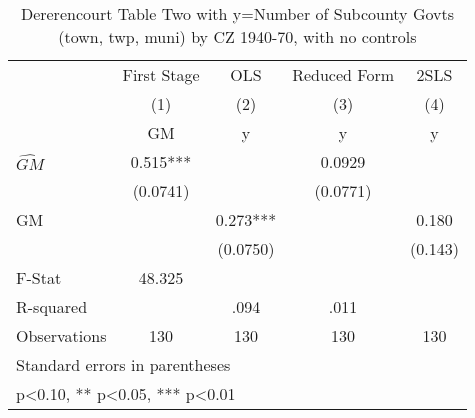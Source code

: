 \begin{table}[htbp]\centering
\def\sym#1{\ifmmode^{#1}\else\(^{#1}\)\fi}
\caption{Dererencourt Table Two with y=Number of Subcounty Govts (town, twp, muni) by CZ 1940-70, with no controls}
\begin{tabular}{l*{4}{c}}
\toprule
                    & First Stage   &         OLS   &Reduced Form   &        2SLS   \\
                    &\multicolumn{1}{c}{(1)}&\multicolumn{1}{c}{(2)}&\multicolumn{1}{c}{(3)}&\multicolumn{1}{c}{(4)}\\
                    &\multicolumn{1}{c}{GM}&\multicolumn{1}{c}{y}&\multicolumn{1}{c}{y}&\multicolumn{1}{c}{y}\\
\midrule
$\hat{GM}$          &       0.515***&               &      0.0929   &               \\
                    &    (0.0741)   &               &    (0.0771)   &               \\
\addlinespace
GM                  &               &       0.273***&               &       0.180   \\
                    &               &    (0.0750)   &               &     (0.143)   \\
\midrule
F-Stat              &      48.325   &               &               &               \\
R-squared           &               &        .094   &        .011   &               \\
Observations        &         130   &         130   &         130   &         130   \\
\bottomrule
\multicolumn{5}{l}{\footnotesize Standard errors in parentheses}\\
\multicolumn{5}{l}{\footnotesize * p<0.10, ** p<0.05, *** p<0.01}\\
\end{tabular}
\end{table}
